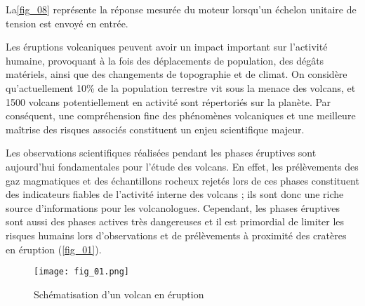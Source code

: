 La\autoref{fig_08} représente la réponse mesurée du moteur lorsqu’un échelon unitaire de tension est
envoyé en entrée.
















Les éruptions volcaniques peuvent avoir un impact important sur l'activité humaine, provoquant à
la fois des déplacements de population, des dégâts matériels, ainsi que des changements de
topographie et de climat. On considère qu'actuellement 10\% de la population terrestre vit sous la
menace des volcans, et 1500 volcans potentiellement en activité sont répertoriés sur la planète.
Par conséquent, une compréhension fine des phénomènes volcaniques et une meilleure maîtrise
des risques associés constituent un enjeu scientifique majeur.

Les observations scientifiques réalisées pendant les phases éruptives sont aujourd'hui
fondamentales pour l'étude des volcans. En effet, les prélèvements des gaz magmatiques et des
échantillons rocheux rejetés lors de ces phases constituent des indicateurs fiables de l'activité
interne des volcans ; ils sont donc une riche source d'informations pour les volcanologues.
Cependant, les phases éruptives sont aussi des phases actives très dangereuses et il est
primordial de limiter les risques humains lors d'observations et de prélèvements à proximité des
cratères en éruption (\autoref{fig_01}). 



\begin{figure}[H]
\centering
\texttt{[image: fig\_01.png]}
\caption{Schématisation d'un volcan en éruption \label{fig_01}}
\end{figure}


